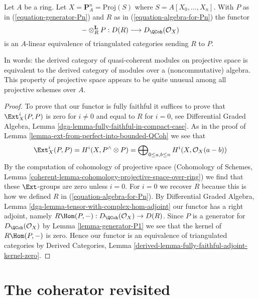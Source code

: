 \begin{lemma}
\label{lemma-Pn-module-category}
\begin{reference}
\cite{Beilinson}
\end{reference}
Let $A$ be a ring. Let $X = \mathbf{P}^n_A = \text{Proj}(S)$
where $S = A[X_0, \ldots, X_n]$. With
$P$ as in (\ref{equation-generator-Pn}) and
$R$ as in (\ref{equation-algebra-for-Pn})
the functor
$$
- \otimes_R^\mathbf{L} P : D(R) \longrightarrow D_\QCoh(\mathcal{O}_X)
$$
is an $A$-linear equivalence of triangulated categories sending $R$
to $P$.
\end{lemma}

\noindent
In words: the derived category of quasi-coherent modules on
projective space is equivalent to the derived category of modules
over a (noncommutative) algebra.
This property of projective space appears to be quite unusual among
all projective schemes over $A$.

\begin{proof}
To prove that our functor is fully faithful it suffices to prove
that $\Ext^i_X(P, P)$ is zero for $i \not = 0$ and equal
to $R$ for $i = 0$, see
Differential Graded Algebra, Lemma
\ref{dga-lemma-fully-faithful-in-compact-case}.
As in the proof of
Lemma \ref{lemma-ext-from-perfect-into-bounded-QCoh}
we see that
$$
\Ext^i_X(P, P) = H^i(X, P^\wedge \otimes P) =
\bigoplus\nolimits_{0 \leq a, b \leq n} H^i(X, \mathcal{O}_X(a - b))
$$
By the computation of cohomology of projective space
(Cohomology of Schemes, Lemma
\ref{coherent-lemma-cohomology-projective-space-over-ring})
we find that
these $\Ext$-groups are zero unless $i = 0$.
For $i = 0$ we recover $R$ because this is how we defined $R$
in (\ref{equation-algebra-for-Pn}).
By Differential Graded Algebra, Lemma
\ref{dga-lemma-tensor-with-complex-hom-adjoint}
our functor has a right adjoint, namely
$R\Hom(P, -) : D_\QCoh(\mathcal{O}_X) \to D(R)$.
Since $P$ is a generator for $D_\QCoh(\mathcal{O}_X)$ by
Lemma \ref{lemma-generator-P1}
we see that the kernel of $R\Hom(P, -)$ is zero.
Hence our functor is an equivalence of triangulated
categories by Derived Categories, Lemma
\ref{derived-lemma-fully-faithful-adjoint-kernel-zero}.
\end{proof}






\section{The coherator revisited}
\label{section-better-coherator}

